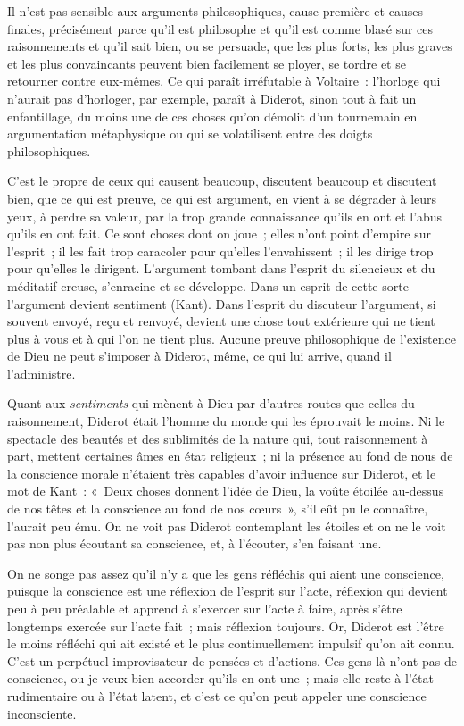 \documentclass[french,twoside]{book} %
\begin{document}
Il n’est pas sensible aux arguments philosophiques,  cause première et causes finales, précisément parce qu’il est philosophe et qu’il est comme blasé sur ces raisonnements et qu’il sait bien, ou se persuade, que les plus forts, les plus graves et les plus convaincants peuvent bien facilement se ployer, se tordre et se retourner contre eux-mêmes. Ce qui paraît irréfutable à Voltaire : l’horloge qui n’aurait pas d’horloger, par exemple, paraît à Diderot, sinon tout à fait un enfantillage, du moins une de ces choses qu’on démolit d’un tournemain en argumentation métaphysique ou qui se volatilisent entre des doigts philosophiques.\par
C’est le propre de ceux qui causent beaucoup, discutent beaucoup et discutent bien, que ce qui est preuve, ce qui est argument, en vient à se dégrader à leurs yeux, à perdre sa valeur, par la trop grande connaissance qu’ils en ont et l’abus qu’ils en ont fait. Ce sont choses dont on joue ; elles n’ont point d’empire sur l’esprit ; il les fait trop caracoler pour qu’elles l’envahissent ; il les dirige trop pour qu’elles le dirigent. L’argument tombant dans l’esprit du silencieux et du méditatif creuse, s’enracine et se développe. Dans un esprit de cette sorte l’argument devient sentiment (Kant). Dans l’esprit du discuteur l’argument, si souvent envoyé, reçu et renvoyé, devient une chose tout extérieure qui ne tient plus à vous et à qui l’on ne tient plus.  Aucune preuve philosophique de l’existence de Dieu ne peut s’imposer à Diderot, même, ce qui lui arrive, quand il l’administre.\par
Quant aux {\itshape sentiments} qui mènent à Dieu par d’autres routes que celles du raisonnement, Diderot était l’homme du monde qui les éprouvait le moins. Ni le spectacle des beautés et des sublimités de la nature qui, tout raisonnement à part, mettent certaines âmes en état religieux ; ni la présence au fond de nous de la conscience morale n’étaient très capables d’avoir influence sur Diderot, et le mot de Kant : « Deux choses donnent l’idée de Dieu, la voûte étoilée au-dessus de nos têtes et la conscience au fond de nos cœurs », s’il eût pu le connaître, l’aurait peu ému. On ne voit pas Diderot contemplant les étoiles et on ne le voit pas non plus écoutant sa conscience, et, à l’écouter, s’en faisant une.\par
On ne songe pas assez qu’il n’y a que les gens réfléchis qui aient une conscience, puisque la conscience est une réflexion de l’esprit sur l’acte, réflexion qui devient peu à peu préalable et apprend à s’exercer sur l’acte à faire, après s’être longtemps exercée sur l’acte fait ; mais réflexion toujours. Or, Diderot est l’être le moins réfléchi qui ait existé et le plus continuellement impulsif qu’on ait connu. C’est un perpétuel improvisateur de pensées et  d’actions. Ces gens-là n’ont pas de conscience, ou je veux bien accorder qu’ils en ont une ; mais elle reste à l’état rudimentaire ou à l’état latent, et c’est ce qu’on peut appeler une conscience inconsciente.\par
\end{document}
